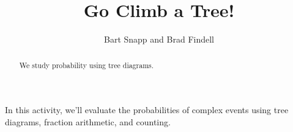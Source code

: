 \documentclass[nooutcomes]{ximera}
\title{Go Climb a Tree!}
\author{Bart Snapp and Brad Findell}
\begin{document}
\begin{abstract}
  We study probability using tree diagrams.
\end{abstract}
\maketitle



In this activity, we'll evaluate the probabilities of complex events
using tree diagrams, fraction arithmetic, and counting.

%
%

%
\end{document}
